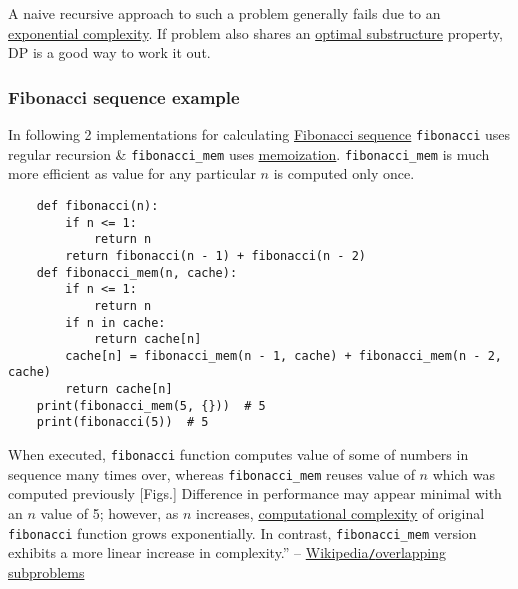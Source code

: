 \documentclass{article}
\begin{document}
A naive recursive approach to such a problem generally fails due to an \href{https://en.wikipedia.org/wiki/Exponential_time}{exponential complexity}. If problem also shares an \href{https://en.wikipedia.org/wiki/Optimal_substructure}{optimal substructure} property, DP is a good way to work it out.

\subsubsection{Fibonacci sequence example}
In following 2 implementations for calculating \href{https://en.wikipedia.org/wiki/Fibonacci_sequence}{Fibonacci sequence} {\tt fibonacci} uses regular recursion \& \verb|fibonacci_mem| uses \href{https://en.wikipedia.org/wiki/Memoization}{memoization}. \verb|fibonacci_mem| is much more efficient as value for any particular $n$ is computed only once.
\begin{verbatim}
	def fibonacci(n):
	    if n <= 1:
	        return n
	    return fibonacci(n - 1) + fibonacci(n - 2)
	def fibonacci_mem(n, cache):
	    if n <= 1:
	        return n
	    if n in cache:
	        return cache[n]
	    cache[n] = fibonacci_mem(n - 1, cache) + fibonacci_mem(n - 2, cache)
	    return cache[n]
	print(fibonacci_mem(5, {}))  # 5
	print(fibonacci(5))  # 5
\end{verbatim}
When executed, {\tt fibonacci} function computes value of some of numbers in sequence many times over, whereas \verb|fibonacci_mem| reuses value of $n$ which was computed previously [Figs.] Difference in performance may appear minimal with an $n$ value of 5; however, as $n$ increases, \href{https://en.wikipedia.org/wiki/Computational_complexity}{computational complexity} of original {\tt fibonacci} function grows exponentially. In contrast, \verb|fibonacci_mem| version exhibits a more linear increase in complexity.'' -- \href{https://en.wikipedia.org/wiki/Overlapping_subproblems}{Wikipedia{\tt/}overlapping subproblems}

\end{document}
